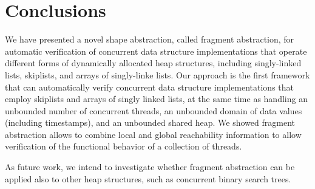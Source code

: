 \section{Conclusions}
\label{sec:conclusions}
We have presented a novel shape abstraction, called fragment abstraction,
for automatic verification of
concurrent data structure implementations that operate different forms of
dynamically allocated heap structures, including singly-linked lists, skiplists,
and arrays of singly-linke lists.
Our approach is the first framework that
can automatically verify concurrent data structure implementations that employ
skiplists and arrays of singly linked lists,
at the same time as handling an unbounded
number of concurrent threads, an unbounded domain of data values
(including timestamps), and an unbounded shared heap.
We showed fragment abstraction allows to combine local and global reachability
information to allow verification of the functional behavior
of a collection of threads.

As future work, we intend to investigate whether fragment abstraction can be
applied also to other heap structures, such as concurrent binary search trees.
%

